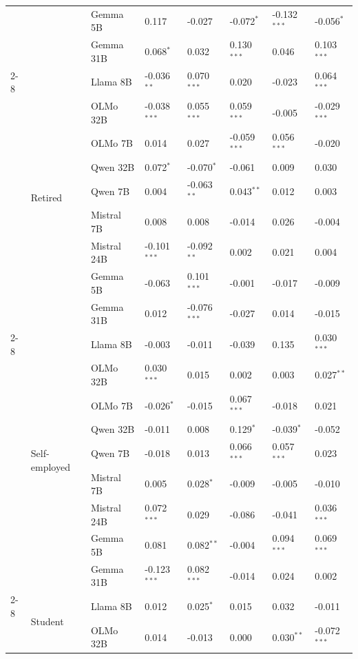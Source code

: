 \begin{longtable}[t]{llllllll}
 &  & Gemma 5B & 0.117 & -0.027 & -0.072$^{*}$ & -0.132$^{***}$ & -0.056$^{*}$ \\
 &  & Gemma 31B & 0.068$^{*}$ & 0.032 & 0.130$^{***}$ & 0.046 & 0.103$^{***}$ \\
\cline{2-8}
 & \multirow[t]{9}{*}{Retired} & Llama 8B & -0.036$^{**}$ & 0.070$^{***}$ & 0.020 & -0.023 & 0.064$^{***}$ \\
 &  & OLMo 32B & -0.038$^{***}$ & 0.055$^{***}$ & 0.059$^{***}$ & -0.005 & -0.029$^{***}$ \\
 &  & OLMo 7B & 0.014 & 0.027 & -0.059$^{***}$ & 0.056$^{***}$ & -0.020 \\
 &  & Qwen 32B & 0.072$^{*}$ & -0.070$^{*}$ & -0.061 & 0.009 & 0.030 \\
 &  & Qwen 7B & 0.004 & -0.063$^{**}$ & 0.043$^{**}$ & 0.012 & 0.003 \\
 &  & Mistral 7B & 0.008 & 0.008 & -0.014 & 0.026 & -0.004 \\
 &  & Mistral 24B & -0.101$^{***}$ & -0.092$^{**}$ & 0.002 & 0.021 & 0.004 \\
 &  & Gemma 5B & -0.063 & 0.101$^{***}$ & -0.001 & -0.017 & -0.009 \\
 &  & Gemma 31B & 0.012 & -0.076$^{***}$ & -0.027 & 0.014 & -0.015 \\
\cline{2-8}
 & \multirow[t]{9}{*}{Self-employed} & Llama 8B & -0.003 & -0.011 & -0.039 & 0.135 & 0.030$^{***}$ \\
 &  & OLMo 32B & 0.030$^{***}$ & 0.015 & 0.002 & 0.003 & 0.027$^{**}$ \\
 &  & OLMo 7B & -0.026$^{*}$ & -0.015 & 0.067$^{***}$ & -0.018 & 0.021 \\
 &  & Qwen 32B & -0.011 & 0.008 & 0.129$^{*}$ & -0.039$^{*}$ & -0.052 \\
 &  & Qwen 7B & -0.018 & 0.013 & 0.066$^{***}$ & 0.057$^{***}$ & 0.023 \\
 &  & Mistral 7B & 0.005 & 0.028$^{*}$ & -0.009 & -0.005 & -0.010 \\
 &  & Mistral 24B & 0.072$^{***}$ & 0.029 & -0.086 & -0.041 & 0.036$^{***}$ \\
 &  & Gemma 5B & 0.081 & 0.082$^{**}$ & -0.004 & 0.094$^{***}$ & 0.069$^{***}$ \\
 &  & Gemma 31B & -0.123$^{***}$ & 0.082$^{***}$ & -0.014 & 0.024 & 0.002 \\
\cline{2-8}
 & \multirow[t]{9}{*}{Student} & Llama 8B & 0.012 & 0.025$^{*}$ & 0.015 & 0.032 & -0.011 \\
 &  & OLMo 32B & 0.014 & -0.013 & 0.000 & 0.030$^{**}$ & -0.072$^{***}$ \\

\end{longtable}
